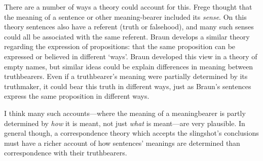 There are a number of ways a theory could account for this.
Frege thought that the meaning of a sentence or other meaning-bearer included its \textit{sense}.
\parencite[210]{Frege_1948} 
On this theory sentences also have a referent (truth or falsehood), and many such senses could all be associated with the same referent.
Braun develops a similar theory regarding the expression of propositions: that the same proposition can be expressed or believed in different `ways'.
Braun developed this view in a theory of empty names, but similar ideas could be explain differences in meaning between truthbearers.
Even if a truthbearer's meaning were partially determined by its truthmaker, it could bear this truth in different ways, just as Braun's sentences express the same proposition in different ways.

I think many such accounts---where the meaning of a meaningbearer is partly determined by \emph{how} it is meant, not just \emph{what} is meant---are very plausible.
In general though, a correspondence theory which accepts the slingshot's conclusions must have a richer account of how sentences' meanings are determined than correspondence with their truthbearers.



